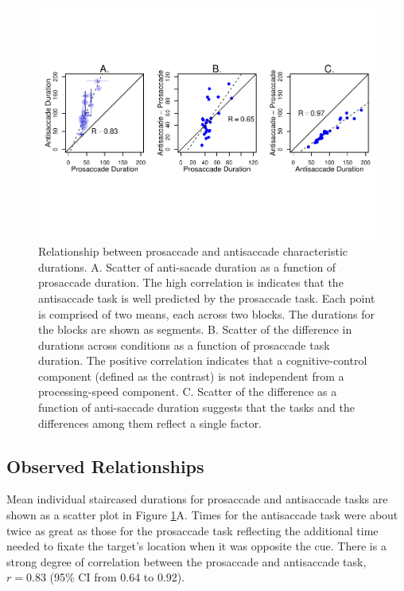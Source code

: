 \documentclass[
  ,man,floatsintext]{apa6}
\begin{document}
\begin{figure}
\centering
\includegraphics{p_files/figure-latex/scatter-1.pdf}
\caption{\label{fig:scatter}Relationship between prosaccade and antisaccade characteristic durations. A. Scatter of anti-sacade duration as a function of prosaccade duration. The high correlation is indicates that the antisaccade task is well predicted by the prosaccade task. Each point is comprised of two means, each across two blocks. The durations for the blocks are shown as segments. B. Scatter of the difference in durations across conditions as a function of prosaccade task duration. The positive correlation indicates that a cognitive-control component (defined as the contrast) is not independent from a processing-speed component. C. Scatter of the difference as a function of anti-saccade duration suggests that the tasks and the differences among them reflect a single factor.}
\end{figure}

\hypertarget{observed-relationships}{%
\subsection{Observed Relationships}\label{observed-relationships}}

Mean individual staircased durations for prosaccade and antisaccade tasks are shown as a scatter plot in Figure \ref{fig:scatter}A. Times for the antisaccade task were about twice as great as those for the prosaccade task reflecting the additional time needed to fixate the target's location when it was opposite the cue. There is a strong degree of correlation between the prosaccade and antisaccade task, \(r=0.83\) (95\% CI from 0.64 to 0.92).
\end{document}
